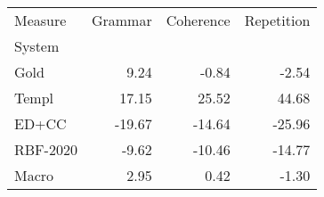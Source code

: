 \begin{tabular}{lrrr}
\toprule
Measure & Grammar & Coherence & Repetition \\
System &  &  &  \\
\midrule
Gold & 9.24 & -0.84 & -2.54 \\
Templ & 17.15 & 25.52 & 44.68 \\
ED+CC & -19.67 & -14.64 & -25.96 \\
RBF-2020 & -9.62 & -10.46 & -14.77 \\
Macro & 2.95 & 0.42 & -1.30 \\
\bottomrule
\end{tabular}
